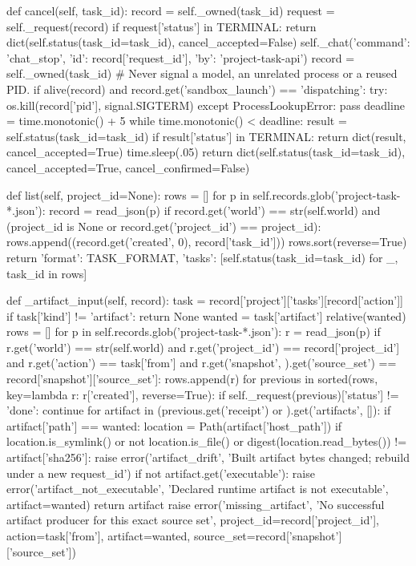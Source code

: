     def cancel(self, task_id):
        record = self._owned(task_id)
        request = self._request(record)
        if request['status'] in TERMINAL:
            return dict(self.status(task_id=task_id), cancel_accepted=False)
        self._chat({'command': 'chat_stop', 'id': record['request_id'], 'by': 'project-task-api'})
        record = self._owned(task_id)
        # Never signal a model, an unrelated process or a reused PID.
        if alive(record) and record.get('sandbox_launch') == 'dispatching':
            try:
                os.kill(record['pid'], signal.SIGTERM)
            except ProcessLookupError:
                pass
        deadline = time.monotonic() + 5
        while time.monotonic() < deadline:
            result = self.status(task_id=task_id)
            if result['status'] in TERMINAL:
                return dict(result, cancel_accepted=True)
            time.sleep(.05)
        return dict(self.status(task_id=task_id), cancel_accepted=True, cancel_confirmed=False)

    def list(self, project_id=None):
        rows = []
        for p in self.records.glob('project-task-*.json'):
            record = read_json(p)
            if record.get('world') == str(self.world) and (project_id is None or record.get('project_id') == project_id):
                rows.append((record.get('created', 0), record['task_id']))
        rows.sort(reverse=True)
        return {'format': TASK_FORMAT, 'tasks': [self.status(task_id=task_id) for _, task_id in rows]}

    def _artifact_input(self, record):
        task = record['project']['tasks'][record['action']]
        if task['kind'] != 'artifact':
            return None
        wanted = task['artifact']
        relative(wanted)
        rows = []
        for p in self.records.glob('project-task-*.json'):
            r = read_json(p)
            if r.get('world') == str(self.world) and r.get('project_id') == record['project_id'] and r.get('action') == task['from'] and r.get('snapshot', {}).get('source_set') == record['snapshot']['source_set']:
                rows.append(r)
        for previous in sorted(rows, key=lambda r: r['created'], reverse=True):
            if self._request(previous)['status'] != 'done':
                continue
            for artifact in (previous.get('receipt') or {}).get('artifacts', []):
                if artifact['path'] == wanted:
                    location = Path(artifact['host_path'])
                    if location.is_symlink() or not location.is_file() or digest(location.read_bytes()) != artifact['sha256']:
                        raise error('artifact_drift', 'Built artifact bytes changed; rebuild under a new request_id')
                    if not artifact.get('executable'):
                        raise error('artifact_not_executable', 'Declared runtime artifact is not executable', artifact=wanted)
                    return artifact
        raise error('missing_artifact', 'No successful artifact producer for this exact source set',
                    project_id=record['project_id'], action=task['from'], artifact=wanted, source_set=record['snapshot']['source_set'])

